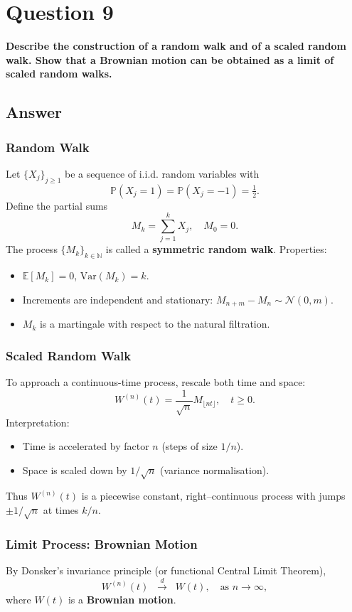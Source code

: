 \documentclass[12pt,a4paper]{book}
\theoremstyle{remark}
\newcommand{\PP}{\mathbb{P}}          %
\newcommand{\EE}{\mathbb{E}}          %
\newcommand{\NN}{\mathbb{N}}
\newcommand{\Var}{\mathrm{Var}}       %
\newcommand{\Normal}{\mathcal{N}}
\begin{document}
\newpage
\section{Question 9}
\textbf{Describe the construction of a random walk and of a scaled random walk. Show that a Brownian motion can be obtained as a limit of scaled random walks.}

\subsection*{Answer}

\subsubsection*{Random Walk}
Let $\{X_j\}_{j\geq 1}$ be a sequence of i.i.d. random variables with
\[
\PP(X_j = 1) = \PP(X_j = -1) = \tfrac{1}{2}.
\]
Define the partial sums
\[
M_k = \sum_{j=1}^k X_j, \quad M_0=0.
\]
The process $\{M_k\}_{k\in\NN}$ is called a \textbf{symmetric random walk}.  
Properties:
\begin{itemize}
    \item $\EE[M_k] = 0$, $\Var(M_k) = k$.
    \item Increments are independent and stationary: $M_{n+m}-M_n \sim \Normal(0,m)$.
    \item $M_k$ is a martingale with respect to the natural filtration.
\end{itemize}

\subsubsection*{Scaled Random Walk}
To approach a continuous-time process, rescale both time and space:
\[
W^{(n)}(t) = \frac{1}{\sqrt{n}} M_{\lfloor nt \rfloor}, \quad t \ge 0.
\]
Interpretation:
\begin{itemize}
    \item Time is accelerated by factor $n$ (steps of size $1/n$).
    \item Space is scaled down by $1/\sqrt{n}$ (variance normalisation).
\end{itemize}
Thus $W^{(n)}(t)$ is a piecewise constant, right–continuous process with jumps $\pm 1/\sqrt{n}$ at times $k/n$.

\subsubsection*{Limit Process: Brownian Motion}
By Donsker’s invariance principle (or functional Central Limit Theorem),
\[
W^{(n)}(t) \;\; \xrightarrow{d}\;\; W(t), \quad \text{as } n\to\infty,
\]
where $W(t)$ is a \textbf{Brownian motion}.  
\end{document}
